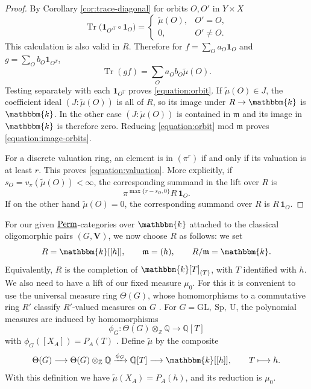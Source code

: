 \documentclass[11pt,a4paper]{amsart}
\theoremstyle{plain}%
\theoremstyle{definition}
\theoremstyle{remark}
\newcommand{\V}{\mathbf{V}}
\newcommand{\Perm}{\underline{{\rm Perm}}}
\newcommand{\kk}{\mathbbm{k}}
\newcommand{\one}{{\mathbf{1}}}
\begin{document}
\begin{proof}
By Corollary \ref{cor:trace-diagonal} for orbits $O,O'$ in $Y \times X$ \[ \operatorname{Tr}\bigl(\one_{O'^T}\circ\one_O\bigr)
 =\begin{cases}
      \widetilde\mu(O),&O'=O,\\
      0,&O'\ne O.
   \end{cases}\]
    This calculation is also valid in $R$. Therefore for
$f=\sum_O a_O\one_O$ and $g=\sum_O b_O\one_{O^T}$,
\[
 \operatorname{Tr}(gf)=\sum_O a_Ob_O\widetilde\mu(O).
\]
Testing separately with each $\one_{O^T}$ proves \eqref{equation:orbit}. 
If $\widetilde\mu(O)\in J$, the coefficient ideal
$(J:\widetilde\mu(O))$ is all of $R$, so its image under $R\to \kk$ is $\kk$.
In the other case $(J:\widetilde\mu(O))$ is contained in $\mathfrak m$ and its image in $\kk$ is therefore zero. Reducing
\eqref{equation:orbit} mod $ \mathfrak{m}$ proves \eqref{equation:image-orbits}.

For a discrete valuation ring, an element is in $(\pi^r)$ if and only if its
valuation is at least $r$. This proves \eqref{equation:valuation}. More explicitly,
if $s_O=v_\pi(\widetilde\mu(O))<\infty$, the corresponding summand in the lift 
over $R$ is
\[
 \pi^{\max\{r-s_O,0\}}R\,\one_O.
\]
If on the other hand $\widetilde\mu(O)=0$, the corresponding summand over $R$ is $R\,\one_O$.

\end{proof}


For our given $\Perm$-categories over $\kk$ attached to the classical oligomorphic pairs $(G, \V)$, we now choose $R$ as follows: we set 
\[
 R=\kk[[h]],\qquad\mathfrak m=(h),\qquad R/\mathfrak m=\kk.
\] Equivalently, $R$ is the completion of $\kk[T]_{(T)}$, with $T$ identified
with $h$. We also need to have a lift of our fixed measure $\mu_0$. For this it is convenient to use the universal measure ring $\Theta(G)$, whose homomorphisms
to a commutative ring $R'$ classify $R'$-valued measures on $G$
\cite[Section~3]{HS-oligomorphic}. For $G=\mathrm{GL},~\mathrm{Sp},~\mathrm U$, the polynomial measures are induced by homomorphisms
\[
 \phi_G:\Theta(G)\otimes_{\mathbb Z}\mathbb Q
             \longrightarrow\mathbb Q[T]
\]
with $\phi_G([X_A])=P_A(T)$ \cite[Corollaries~6.17, 8.12 and~10.10]{HS-classical}.
Define $\widetilde\mu$ by the composite
\begin{equation}\label{sec68:measure}
 \Theta(G)\longrightarrow\Theta(G)\otimes_{\mathbb Z}\mathbb Q
 \xrightarrow{\phi_G}\mathbb Q[T]
 \longrightarrow {\kk}[[h]],\qquad T\longmapsto h.
\end{equation}
With this definition we have $\widetilde\mu(X_A)=P_A(h)$, and its reduction is $\mu_0$. 
\end{document}
